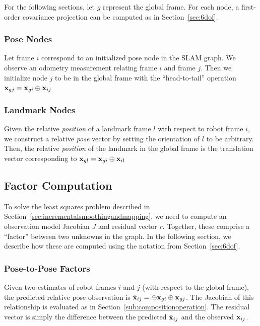 \documentclass[conference]{IEEEtran}
\begin{document}
For the following sections, let $g$ represent the global frame.  For each node, a
first-order covariance projection can be computed as in Section~\ref{sec:6dof}.

\subsubsection{Pose Nodes}
\label{subs:posenodeinit}

Let frame $i$ correspond to an initialized pose node in the \ac{SLAM} graph.  We observe an
odometry measurement relating frame $i$ and frame $j$.  Then we initialize node $j$ to be
in the global frame with the ``head-to-tail'' operation $ {\bf x}_{gj} = {\bf
  x}_{gi} \oplus {\bf x}_{ij} $

\subsubsection{Landmark Nodes}
\label{subs:pointnodeinit}
Given the relative {\it position} of a landmark frame $l$ with respect to robot frame $i$,
we construct a relative {\it pose} vector by setting the orientation of $l$ to be
arbitrary.  Then, the relative {\it position} of the landmark in the global frame is the
translation vector corresponding to $ {\bf x}_{gl} = {\bf x}_{gi} \oplus {\bf
 x}_{il} $

\subsection{Factor Computation}
\label{sub:nodeinitializationandedgeresiduals}

To solve the least squares problem described in
Section~\ref{sec:incrementalsmoothingandmapping}, we need to compute an observation model
Jacobian $J$ and residual vector $r$.  Together, these comprise a ``factor'' between two
unknowns in the graph.  In the following section, we describe how these are computed using
the notation from Section~\ref{sec:6dof}.

\subsubsection{Pose-to-Pose Factors}
\label{subs:posenodelinear}
Given two estimates of robot frames $i$ and $j$ (with respect to the global frame), the
predicted relative pose observation is $ {\hat {\bf x}_{ij}} = \ominus {\bf x}_{gi} \oplus
{\bf x}_{gj}$. The Jacobian of this relationship is evaluated as in
Section~\ref{sub:compositionoperation}.  The residual vector is simply the difference
between the predicted ${\hat {\bf x}_{ij}}$ and the observed ${\bf x}_{ij}$.
\end{document}
